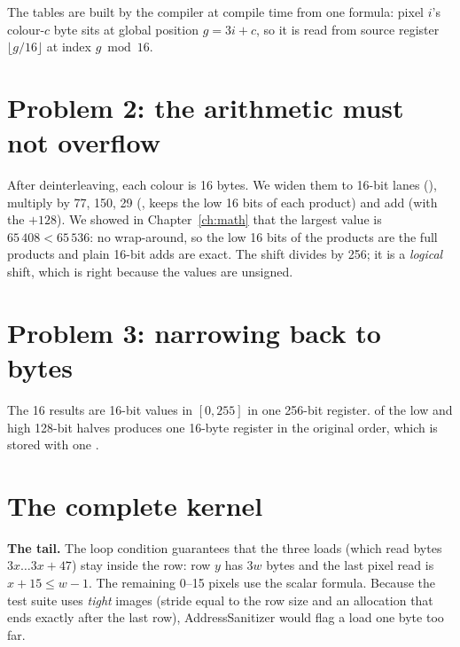 \begin{center}
\small

\end{center}

The tables are built by the compiler at compile time from one formula: pixel $i$'s colour-$c$ byte sits at global position $g=3i+c$, so it is read from source register $\lfloor g/16\rfloor$ at index $g\bmod16$.



\section{Problem 2: the arithmetic must not overflow}

After deinterleaving, each colour is 16 bytes. We widen them to 16-bit lanes (), multiply by 77, 150, 29 (, keeps the low 16 bits of each product) and add (with the $+128$). We showed in Chapter~\ref{ch:math} that the largest value is $65\,408<65\,536$: no wrap-around, so the low 16 bits of the products are the full products and plain 16-bit adds are exact. The shift  divides by 256; it is a \emph{logical} shift, which is right because the values are unsigned.

\section{Problem 3: narrowing back to bytes}

The 16 results are 16-bit values in $[0,255]$ in one 256-bit register.  of the low and high 128-bit halves produces one 16-byte register in the original order, which is stored with one .

\section{The complete kernel}



\begin{plain}
\textbf{The tail.} The loop condition  guarantees that the three loads (which read bytes $3x\dots3x+47$) stay inside the row: row $y$ has $3w$ bytes and the last pixel read is $x+15\le w-1$. The remaining 0--15 pixels use the scalar formula. Because the test suite uses \emph{tight} images (stride equal to the row size and an allocation that ends exactly after the last row), AddressSanitizer would flag a load one byte too far.
\end{plain}

